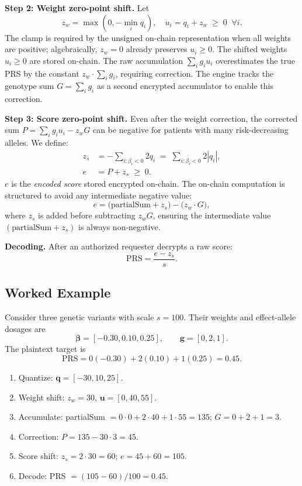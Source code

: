 \documentclass[10pt]{article}
\begin{document}
\textbf{Step 2: Weight zero-point shift.}  Let
\begin{equation}
z_w = \max(0,-\min_i q_i), \quad u_i = q_i + z_w \;\geq\; 0 \;\;\forall i.
\label{eq:wshift}
\end{equation}
The clamp is required by the unsigned on-chain representation when all weights are
positive; algebraically, $z_w=0$ already preserves $u_i\geq0$.  The shifted weights
$u_i \geq 0$ are stored on-chain.  The raw accumulation
$\sum_i g_i u_i$ overestimates the true PRS by the constant $z_w \cdot \sum_i g_i$,
requiring correction.  The engine tracks the genotype sum
$G = \sum_i g_i$ as a second encrypted accumulator to enable this correction.

\textbf{Step 3: Score zero-point shift.}
Even after the weight correction, the corrected sum
$P = \sum_i g_i u_i - z_w G$
can be negative for patients with many risk-decreasing alleles.  We define:
\begin{align}
z_s &= -\sum_{i:\beta_i<0} 2 q_i \;=\; \sum_{i:\beta_i<0} 2|q_i|,\\
e   &= P + z_s \;\geq\; 0.
\end{align}
$e$ is the \emph{encoded score} stored encrypted on-chain.  The on-chain
computation is structured to avoid any intermediate negative value:
\begin{equation}
e = \bigl(\mathrm{partialSum} + z_s\bigr) - \bigl(z_w \cdot G\bigr),
\label{eq:encode}
\end{equation}
where $z_s$ is added before subtracting $z_w G$, ensuring the intermediate
value $(\mathrm{partialSum} + z_s)$ is always non-negative.

\textbf{Decoding.}  After an authorized requester decrypts a raw score:
\begin{equation}
\mathrm{PRS} = \frac{e - z_s}{s}.
\end{equation}

\subsection{Worked Example}

Consider three genetic variants with scale $s=100$.  Their weights and effect-allele
dosages are
\[
\boldsymbol{\beta}=[-0.30,0.10,0.25],\qquad \mathbf{g}=[0,2,1].
\]
The plaintext target is
\[
\mathrm{PRS}=0(-0.30)+2(0.10)+1(0.25)=0.45.
\]

\begin{enumerate}
  \item Quantize: $\mathbf{q} = [-30, 10, 25]$.
  \item Weight shift: $z_w = 30$, $\mathbf{u} = [0, 40, 55]$.
  \item Accumulate: partialSum $= 0{\cdot}0 + 2{\cdot}40 + 1{\cdot}55 = 135$;
        $G = 0 + 2 + 1 = 3$.
  \item Correction: $P = 135 - 30{\cdot}3 = 45$.
  \item Score shift: $z_s = 2{\cdot}30 = 60$; $e = 45 + 60 = 105$.
  \item Decode: PRS $= (105 - 60) / 100 = 0.45$.
\end{enumerate}
\end{document}
